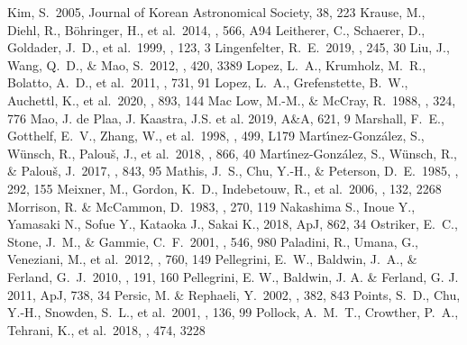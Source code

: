 \documentclass[usenatbib]{mnras}
\begin{document}
\begin{thebibliography}{}
Kim, S.\ 2005, Journal of Korean Astronomical Society, 38, 223
Krause, M., Diehl, R., B{\"o}hringer, H., et al.\ 2014, \aap, 566, A94
Leitherer, C., Schaerer, D., Goldader, J.~D., et al.\ 1999, \apjs, 123, 3
Lingenfelter, R.~E.\ 2019, \apjs, 245, 30
Liu, J., Wang, Q.~D., \& Mao, S.\ 2012, \mnras, 420, 3389
Lopez, L.~A., Krumholz, M.~R., Bolatto, A.~D., et al.\ 2011, \apj, 731, 91
Lopez, L.~A., Grefenstette, B.~W., Auchettl, K., et al.\ 2020, \apj, 893, 144
Mac Low, M.-M., \& McCray, R.\ 1988, \apj, 324, 776
Mao, J. de Plaa, J. Kaastra, J.S. et al. 2019, A\&A, 621, 9
Marshall, F.~E., Gotthelf, E.~V., Zhang, W., et al.\ 1998, \apjl, 499, L179
 Mart{\'\i}nez-Gonz{\'a}lez, S., W{\"u}nsch, R., Palou{\v{s}}, J., et al.\ 2018, \apj, 866, 40
 Mart{\'\i}nez-Gonz{\'a}lez, S., W{\"u}nsch, R., \& Palou{\v{s}}, J.\ 2017, \apj, 843, 95
Mathis, J.~S., Chu, Y.-H., \& Peterson, D.~E.\ 1985, \apj, 292, 155
Meixner, M., Gordon, K.~D., Indebetouw, R., et al.\ 2006, \aj, 132, 2268
Morrison, R. \& McCammon, D.\ 1983, \apj, 270, 119
Nakashima S., Inoue Y., Yamasaki N., Sofue Y., Kataoka J., Sakai K., 2018, ApJ, 862, 34
Ostriker, E.~C., Stone, J.~M., \& Gammie, C.~F.\ 2001, \apj, 546, 980
 Paladini, R., Umana, G., Veneziani, M., et al.\ 2012, \apj, 760, 149
Pellegrini, E.~W., Baldwin, J.~A., \& Ferland, G.~J.\ 2010, \apjs, 191, 160
Pellegrini, E. W., Baldwin, J. A. \&  Ferland, G. J. 2011, ApJ, 738, 34
Persic, M. \& Rephaeli, Y.\ 2002, \aap, 382, 843 
Points, S.~D., Chu, Y.-H., Snowden, S.~L., et al.\ 2001, \apjs, 136, 99
Pollock, A.~M.~T., Crowther, P.~A., Tehrani, K., et al.\ 2018, \mnras, 474, 3228

\end{thebibliography}
\end{document}
